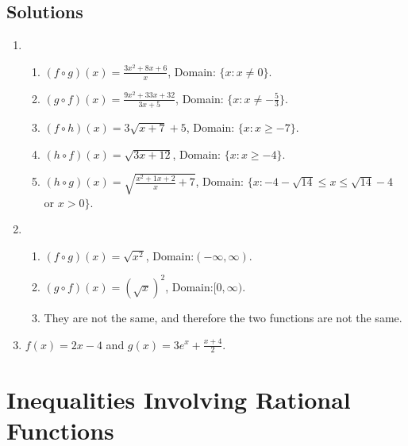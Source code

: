 \documentclass[11pt]{book}               %
\begin{document}
\subsection{Solutions} 
\begin{enumerate}
\item
\begin{enumerate}
\item $(f\circ g)(x)=\frac{3x^2+8x+6}{x}$, Domain: $\{x:x\neq 0\}$.
\item $(g\circ f)(x)=\frac{9x^2+33x+32}{3x+5}$, Domain: $\{x:x\neq -\frac{5}{3}\}$.
\item $(f\circ h)(x)=3\sqrt{x+7}+5$, Domain: $\{x:x\geq-7\}$.
\item $(h\circ f)(x)=\sqrt{3x+12}$, Domain: $\{x:x\geq-4\}$.
\item $(h\circ g)(x)=\sqrt{\frac{x^2+1x+2}{x}+7}$, Domain: $\{x:-4-\sqrt{14}\leq x\leq\sqrt{14}-4$ or $x>0\}$.
\end{enumerate}
\item 
\begin{enumerate}
\item $(f\circ g)(x)=\sqrt{x^2}$, Domain:$(-\infty,\infty)$.
\item $(g\circ f)(x)=(\sqrt{x})^2$, Domain:$[0,\infty)$.
\item They are not the same, and therefore the two functions are not the same.
\end{enumerate}

\item $f(x) = 2x-4$ and $g(x) = 3e^x + \frac{x+4}{2}$.
\end{enumerate}

\newpage
\section{Inequalities Involving Rational Functions}

%
%
%
\end{document}
